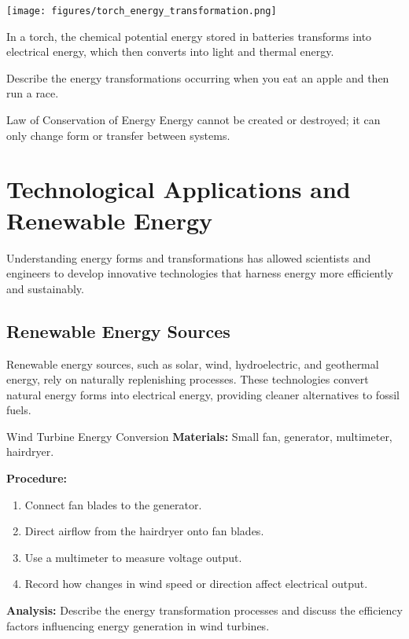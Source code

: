 \begin{marginfigure}
\centering
\texttt{[image: figures/torch\_energy\_transformation.png]}
\caption{Energy transformations in a torch}
\end{marginfigure}

\begin{example}
In a torch, the chemical potential energy stored in batteries transforms into electrical energy, which then converts into light and thermal energy.
\end{example}

\begin{stopandthink}
Describe the energy transformations occurring when you eat an apple and then run a race.
\end{stopandthink}

\begin{keyconcept}{Law of Conservation of Energy}
Energy cannot be created or destroyed; it can only change form or transfer between systems.
\end{keyconcept}

\section{Technological Applications and Renewable Energy}

Understanding energy forms and transformations has allowed scientists and engineers to develop innovative technologies that harness energy more efficiently and sustainably.

\subsection{Renewable Energy Sources}

Renewable energy sources, such as solar, wind, hydroelectric, and geothermal energy, rely on naturally replenishing processes. These technologies convert natural energy forms into electrical energy, providing cleaner alternatives to fossil fuels.

\begin{investigation}{Wind Turbine Energy Conversion}
\textbf{Materials:} Small fan, generator, multimeter, hairdryer.

\textbf{Procedure:}
\begin{enumerate}
\item Connect fan blades to the generator.
\item Direct airflow from the hairdryer onto fan blades.
\item Use a multimeter to measure voltage output.
\item Record how changes in wind speed or direction affect electrical output.
\end{enumerate}

\textbf{Analysis:}
Describe the energy transformation processes and discuss the efficiency factors influencing energy generation in wind turbines.
\end{investigation}

